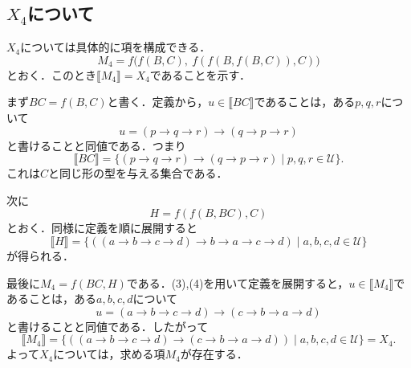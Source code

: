 \documentclass{jsarticle}
\begin{document}
\subsection*{$X_4$について}

$X_4$については具体的に項を構成できる．
\[
  M_4=f\bigl(f(B,C),\ f(f(B,f(B,C)),C)\bigr)
\]
とおく．このとき$\llbracket M_4\rrbracket=X_4$であることを示す．

まず$BC=f(B,C)$と書く．定義から，$u\in\llbracket BC\rrbracket$であることは，ある$p,q,r$について
\[
  u=(p\to q\to r)\to(q\to p\to r)
\]
と書けることと同値である．つまり
\[
  \llbracket BC\rrbracket
  =\{(p\to q\to r)\to(q\to p\to r)\mid p,q,r\in\mathcal U\}.
\tag{3}
\]
これは$C$と同じ形の型を与える集合である．

次に
\[
  H=f(f(B,BC),C)
\]
とおく．同様に定義を順に展開すると
\[
  \llbracket H\rrbracket
  =\{((a\to b\to c\to d)\to b\to a\to c\to d)
      \mid a,b,c,d\in\mathcal U\}
\tag{4}
\]
が得られる．

最後に$M_4=f(BC,H)$である．(3),(4)を用いて定義を展開すると，$u\in\llbracket M_4\rrbracket$であることは，ある$a,b,c,d$について
\[
  u=(a\to b\to c\to d)\to(c\to b\to a\to d)
\]
と書けることと同値である．したがって
\[
  \llbracket M_4\rrbracket
  =\{((a\to b\to c\to d)\to(c\to b\to a\to d))
      \mid a,b,c,d\in\mathcal U\}
  =X_4.
\]
よって$X_4$については，求める項$M_4$が存在する．
\end{document}
